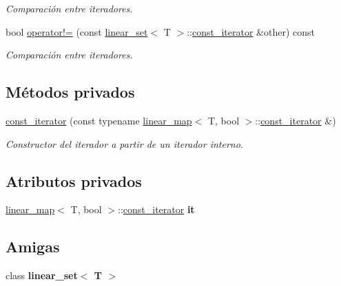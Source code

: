 \begin{DoxyCompactItemize}
\begin{DoxyCompactList}\small\item\em Comparación entre iteradores. \end{DoxyCompactList}\item 
bool \mbox{\hyperlink{classlinear__set_1_1const__iterator_ac06879120ff039d22ce9999cb0a7c6ec}{operator!=}} (const \mbox{\hyperlink{classlinear__set}{linear\+\_\+set}}$<$ T $>$\+::\mbox{\hyperlink{classlinear__set_1_1const__iterator}{const\+\_\+iterator}} \&other) const
\begin{DoxyCompactList}\small\item\em Comparación entre iteradores. \end{DoxyCompactList}\end{DoxyCompactItemize}
\subsection*{Métodos privados}
\begin{DoxyCompactItemize}
\item 
\mbox{\label{classlinear__set_1_1const__iterator_a14bd9ad8205de2c6fab3d8504253ee78}} 
\mbox{\hyperlink{classlinear__set_1_1const__iterator_a14bd9ad8205de2c6fab3d8504253ee78}{const\+\_\+iterator}} (const typename \mbox{\hyperlink{classlinear__map}{linear\+\_\+map}}$<$ T, bool $>$\+::\mbox{\hyperlink{classlinear__set_1_1const__iterator}{const\+\_\+iterator}} \&)
\begin{DoxyCompactList}\small\item\em Constructor del iterador a partir de un iterador interno. \end{DoxyCompactList}\end{DoxyCompactItemize}
\subsection*{Atributos privados}
\begin{DoxyCompactItemize}
\item 
\mbox{\label{classlinear__set_1_1const__iterator_a16ef6914efccf16bfcb659df265244f8}} 
\mbox{\hyperlink{classlinear__map}{linear\+\_\+map}}$<$ T, bool $>$\+::\mbox{\hyperlink{classlinear__set_1_1const__iterator}{const\+\_\+iterator}} {\bfseries it}
\end{DoxyCompactItemize}
\subsection*{Amigas}
\begin{DoxyCompactItemize}
\item 
\mbox{\label{classlinear__set_1_1const__iterator_a534ce5acb60190eb00d1f44365fa38b5}} 
class {\bfseries linear\+\_\+set$<$ T $>$}
\end{DoxyCompactItemize}


